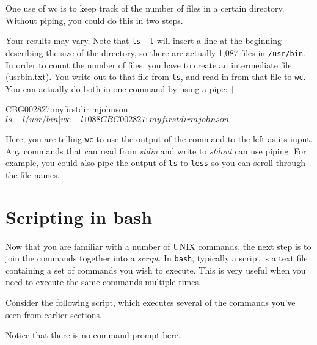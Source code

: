 \documentclass[11pt, oneside]{article}   	%
\newcounter{bash}
\begin{document}
One use of wc is to keep track of the number of files in a certain directory. 
Without piping, you could do this in two steps.

Your results may vary. 
Note that \verb+ls -l+ will insert a line at the beginning describing the size of the directory, so there are actually 1,087 files in \verb+/usr/bin+. 
In order to count the number of files, you have to create an intermediate file (usrbin.txt).
You write out to that file from \verb+ls+, and read in from that file to \verb+wc+.
You can actually do both in one command by using a pipe: \verb+|+

\begin{Terminal}[caption=With a pipe,label=pipe]
CBG002827:myfirstdir mjohnson$ ls -l /usr/bin | wc -l
    1088
CBG002827:myfirstdir mjohnson$ 
\end{Terminal}

Here, you are telling \verb+wc+ to use the output of the command to the left as its input.
Any commands that can read from \emph{stdin} and write to \emph{stdout} can use piping.
For example, you could also pipe the output of \verb+ls+ to \verb+less+ so you can scroll through the file names. 




\section{Scripting in bash}
Now that you are familiar with a number of UNIX commands, the next step is to join the commands together into a \emph{script}.
In \verb+bash+, typically a script is a text file containing a set of commands you wish to execute.
This is very useful when you need to execute the same commands multiple times.

Consider the following script, which executes several of the commands you've seen from earlier sections.

Notice that there is no command prompt here.
\end{document}
